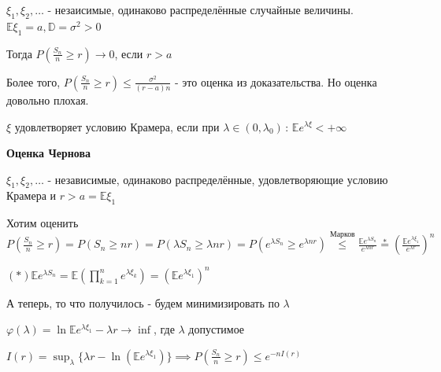  $\xi_1, \xi_2, \ldots$ - незаисимые, одинаково распределённые случайные величины. $\mathbb{E} \xi_1 = a, \mathbb{D} = \sigma^2 > 0$

 Тогда $P\left(\frac{S_n}{n} \geqslant r \right) \rightarrow 0$, если $r > a$

 Более того, $P \left( \frac{S_n}{n} \geqslant r \right) \leqslant \frac{\sigma^2}{(r - a)n}$ - это оценка из доказательства. Но оценка довольно плохая.

 \begin{definition}
    $\xi$ удовлетворяет условию Крамера, если при $\lambda \in (0, \lambda_0)\, : \, \mathbb{E} e^{\lambda \xi} < +\infty$
 \end{definition}

 \begin{theorem}

    \textbf{Оценка Чернова}

    $\xi_1, \xi_2, \ldots$ - независимые, одинаково распределённые, удовлетворяющие условию Крамера и $r > a = \mathbb{E}\xi_1$

    Хотим оценить $P\left( \frac{S_n}{n} \geqslant r \right) = P\left( S_n \geqslant nr \right) = P\left( \lambda S_n \geqslant \lambda nr \right) = P\left( e^{ \lambda S_n} \geqslant e^{\lambda nr} \right) \overset{\text{Марков}}{\leqslant} \frac{\mathbb{E} e^{\lambda S_n}}{e^{\lambda n r}}
    \overset{*}{=} \left( \frac{\mathbb{E} e^{\lambda \xi_1}}{e^{\lambda r}}  \right)^n$

    $(*) \mathbb{E} e^{\lambda S_n} = \mathbb{E} (\prod_{k = 1}^n e^{\lambda \xi_k}) = (\mathbb{E} e^{\lambda \xi_1})^n$

    А теперь, то что получилось - будем минимизировать по $\lambda$

    $\varphi (\lambda) = \ln \mathbb{E} e^{\lambda \xi_1} - \lambda r \rightarrow \inf$, где $\lambda$ допустимое

    $I(r) = \sup_{\lambda} \{ \lambda r - \ln (\mathbb{E} e^{\lambda \xi_1}) \} \implies P \left( \frac{S_n}{n} \geqslant r \right) \leqslant e^{-n I(r)}$
 \end{theorem}


